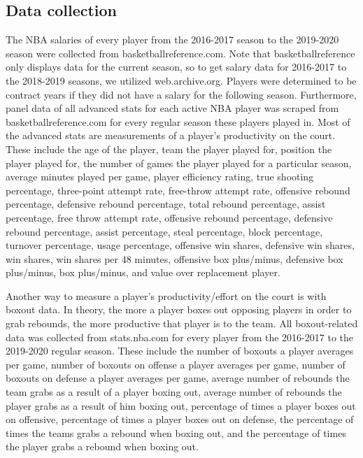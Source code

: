 \documentclass[12pt]{article}
\begin{document}
	\subsection{Data collection}
	
	The NBA salaries of every player from the 2016-2017 season to the 2019-2020 season were collected from basketballreference.com. Note that basketballreference only displays data for the current season, so to get salary data for 2016-2017 to the 2018-2019 seasons, we utilized web.archive.org. Players were determined to be contract years if they did not have a salary for the following season. Furthermore, panel data of all advanced stats for each active NBA player was scraped from basketballreference.com for every regular season these players played in. Most of the advanced stats are measurements of a player's productivity on the court. These include the age of the player, team the player played for, position the player played for, the number of games the player played for a particular season, average minutes played per game, player efficiency rating, true shooting percentage, three-point attempt rate, free-throw attempt rate, offensive rebound percentage, defensive rebound percentage, total rebound percentage, assist percentage, free throw attempt rate, offensive rebound percentage, defensive rebound percentage, assist percentage, steal percentage, block percentage, turnover percentage, usage percentage, offensive win shares, defensive win shares, win shares, win shares per 48 minutes, offensive box plus/minus, defensive box plus/minus, box plus/minus, and value over replacement player. 
	
	Another way to measure a player's productivity/effort on the court is with boxout data. In theory, the more a player boxes out opposing players in order to grab rebounds, the more productive that player is to the team. All boxout-related data was collected from stats.nba.com for every player from the 2016-2017 to the 2019-2020 regular season. These include the number of boxouts a player averages per game, number of boxouts on offense a player averages per game, number of boxouts on defense a player averages per game, average number of rebounds the team grabs as a result of a player boxing out, average number of rebounds the player grabs as a result of him boxing out, percentage of times a player boxes out on offensive, percentage of times a player boxes out on defense, the percentage of times the teams grabs a rebound when boxing out, and the percentage of times the player grabs a rebound when boxing out. 
	
\end{document}
